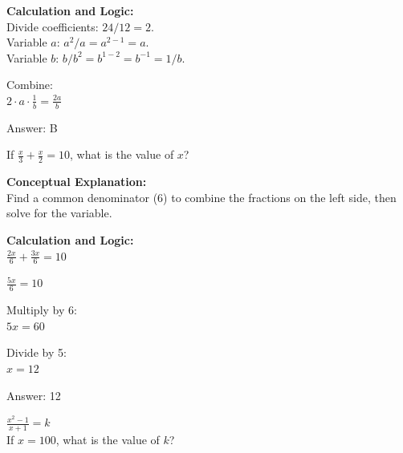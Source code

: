 \documentclass[11pt,paper=a4,answers]{exam}
\begin{document}
\begin{questions}
\begin{solution}
\vspace{20pt}

\textbf{Calculation and Logic:} \\
Divide coefficients: $24 / 12 = 2$. \\
Variable $a$: $a^2 / a = a^{2-1} = a$. \\
Variable $b$: $b / b^2 = b^{1-2} = b^{-1} = 1/b$.

\vspace{10pt}

Combine: \\
$2 \cdot a \cdot \frac{1}{b} = \frac{2a}{b}$

\vspace{25pt}

Answer: \colorbox{yellow!100}{B}
\end{solution}

\vspace{40pt}

\question
If $\frac{x}{3} + \frac{x}{2} = 10$, what is the value of $x$?

\begin{solution}
\textbf{Conceptual Explanation:} \\
Find a common denominator (6) to combine the fractions on the left side, then solve for the variable.

\vspace{20pt}

\textbf{Calculation and Logic:} \\
$\frac{2x}{6} + \frac{3x}{6} = 10$

\vspace{10pt}

$\frac{5x}{6} = 10$

\vspace{10pt}

Multiply by 6: \\
$5x = 60$

\vspace{10pt}

Divide by 5: \\
$x = 12$

\vspace{25pt}

Answer: \colorbox{yellow!100}{12}
\end{solution}

\vspace{40pt}

\question
$\frac{x^2 - 1}{x+1} = k$ \\
If $x = 100$, what is the value of $k$?


\end{questions}
\end{document}
